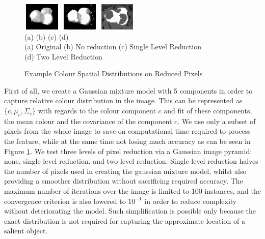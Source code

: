 \documentclass[10pt,twocolumn,letterpaper]{article}
\newcommand{\hs}{\hspace{0.58in}}
\begin{document}
\begin{figure}[t]
\begin{center}
    \includegraphics[width=0.72in,height=0.52in]{./Figures/pydownCompare/3NOPYDOWN.jpg}
    \includegraphics[width=0.72in,height=0.52in]{./Figures/pydownCompare/3PYDOWN.jpg} 
    \includegraphics[width=0.72in,height=0.52in]{./Figures/pydownCompare/3DOUBLEPYDOWN.jpg} \\
    \footnotesize \hspace{0.1cm} (a) \hs (b) \hs  (c) \hs (d) \\
    \footnotesize (a) Original (b) No reduction (c) Single Level Reduction\\ (d) Two Level Reduction
    \caption{Example Colour Spatial Distributions on Reduced Pixels} \label{Fig:GlobalPydown}
    \end{center}
\end{figure}

First of all, we create a Gaussian mixture model with 5 components in order to capture relative colour distribution in the image. This can be represented as $\{c, \mu_c, \Sigma_c\}$ with regards to the colour component $c$ and fit of these components, the mean colour and the covariance of the component $c$.  We use only a subset of pixels from the whole image to save on computational time required to process the feature, while at the same time not losing much accuracy as can be seen in Figure \ref{Fig:GlobalPydown}.  We test three levels of pixel reduction via a Gaussian image pyramid: none, single-level reduction, and two-level reduction.  Single-level reduction halves the number of pixels used in creating the gaussian mixture model, whilst also providing a smoother distribution without sacrificing required accuracy.  The maximum number of iterations over the image is limited to 100 instances, and the convergence criterion is also lowered to $10^{-1}$ in order to reduce complexity without deteriorating the model.  Such simplification is possible only because the exact distribution is not required for capturing the approximate location of a salient object.
\end{document}

